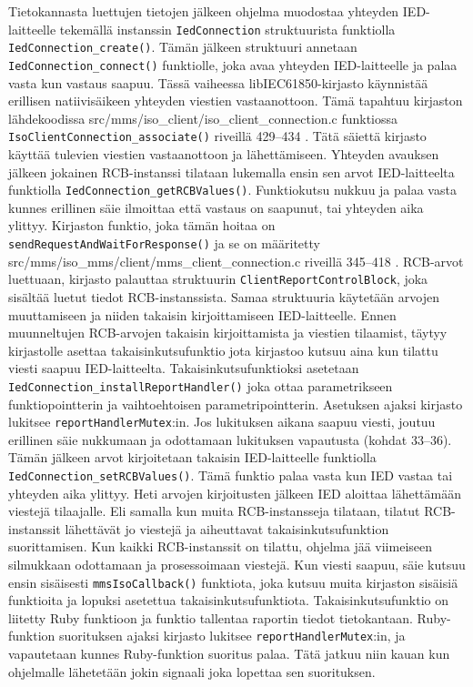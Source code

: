 Tietokannasta luettujen tietojen jälkeen ohjelma muodostaa yhteyden IED-laitteelle tekemällä instanssin \texttt{IedConnection} struktuurista funktiolla \texttt{IedConnection\_create()}. Tämän jälkeen struktuuri annetaan \texttt{IedConnection\_connect()} funktiolle, joka avaa yhteyden IED-laitteelle ja palaa vasta kun vastaus saapuu. Tässä vaiheessa libIEC61850-kirjasto käynnistää erillisen natiivisäikeen yhteyden viestien vastaanottoon. Tämä tapahtuu kirjaston lähdekoodissa src/mms/iso\_client/iso\_client\_connection.c funktiossa \texttt{IsoClientConnection\_associate()} riveillä 429--434 \mbox{\cite{libIEC61850-repo}}. Tätä säiettä kirjasto käyttää tulevien viestien vastaanottoon ja lähettämiseen. Yhteyden avauksen jälkeen jokainen RCB-instanssi tilataan lukemalla ensin sen arvot IED-laitteelta funktiolla \texttt{IedConnection\_getRCBValues()}. Funktiokutsu nukkuu ja palaa vasta kunnes erillinen säie ilmoittaa että vastaus on saapunut, tai yhteyden aika ylittyy. Kirjaston funktio, joka tämän hoitaa on \texttt{sendRequestAndWaitForResponse()} ja se on määritetty src/mms/iso\_mms/client/mms\_client\_connection.c riveillä 345--418 \mbox{\cite{libIEC61850-repo}}. RCB-arvot luettuaan, kirjasto palauttaa struktuurin \texttt{ClientReportControlBlock}, joka sisältää luetut tiedot RCB-instanssista. Samaa struktuuria käytetään arvojen muuttamiseen ja niiden takaisin kirjoittamiseen IED-laitteelle. Ennen muunneltujen RCB-arvojen takaisin kirjoittamista ja viestien tilaamist, täytyy kirjastolle asettaa takaisinkutsufunktio jota kirjastoo kutsuu aina kun tilattu viesti saapuu IED-laitteelta. Takaisinkutsufunktioksi asetetaan \texttt{IedConnection\_installReportHandler()} joka ottaa parametrikseen funktiopointterin ja vaihtoehtoisen parametripointterin. Asetuksen ajaksi kirjasto lukitsee \texttt{reportHandlerMutex}:in. Jos lukituksen aikana saapuu viesti, joutuu erillinen säie nukkumaan ja odottamaan lukituksen vapautusta (kohdat 33--36). Tämän jälkeen arvot kirjoitetaan takaisin IED-laitteelle funktiolla \texttt{IedConnection\_setRCBValues()}. Tämä funktio palaa vasta kun IED vastaa tai yhteyden aika ylittyy. Heti arvojen kirjoitusten jälkeen IED aloittaa lähettämään viestejä tilaajalle. Eli samalla kun muita RCB-instansseja tilataan, tilatut RCB-instanssit lähettävät jo viestejä ja aiheuttavat takaisinkutsufunktion suorittamisen. Kun kaikki RCB-instanssit on tilattu, ohjelma jää viimeiseen silmukkaan odottamaan ja prosessoimaan viestejä. Kun viesti saapuu, säie kutsuu ensin sisäisesti \texttt{mmsIsoCallback()} funktiota, joka kutsuu muita kirjaston sisäisiä funktioita ja lopuksi asetettua takaisinkutsufunktiota. Takaisinkutsufunktio on liitetty Ruby funktioon ja funktio tallentaa raportin tiedot tietokantaan. Ruby-funktion suorituksen ajaksi kirjasto lukitsee \texttt{reportHandlerMutex}:in, ja vapautetaan kunnes Ruby-funktion suoritus palaa. Tätä jatkuu niin kauan kun ohjelmalle lähetetään jokin signaali joka lopettaa sen suorituksen. \mbox{\cite{Kozlovski2017, Storimer2013}}

